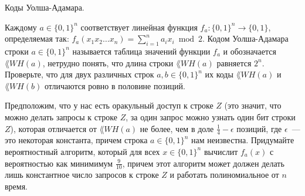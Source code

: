 Коды Уолша-Адамара.
\begin{enumcyr}
    \item Каждому $a \in \{0, 1\}^n$ соответствует линейная функция $f_a: \{0, 1\}^n \to \{0, 1\}$, определяемая так:
	    $f_a(x_1 x_2 \dots x_n) = \sum\limits_{i = 1}^n a_i x_i \bmod 2$. Кодом Уолша-Адамара строки $a \in \{0, 1\}^n$
        называется таблица значений функции $f_a$ и обозначается $\lang{WH}(a)$, нетрудно понять, что длина строки
        $\lang{WH}(a)$ равняется $2^n$. Проверьте, что для двух различных строк $a, b \in \{0, 1\}^n$ их коды $\lang{WH}(a)$
        и $\lang{WH}(b)$ отличаются ровно в половине позиций.
	\item Предположим, что у нас есть оракульный доступ к строке $Z$ (это значит, что можно делать запросы к строке $Z$, за
	    один запрос можно узнать один бит строки $Z$), которая отличается от $\lang{WH}(a)$ не более, чем в доле $\frac{1}{4}
        - \epsilon$ позиций, где $\epsilon$~--- это некоторая константа, причем строка $a \in \{0, 1\}^n$ нам
        неизвестна. Придумайте вероятностный алгоритм, который для всех $x\in \{0,1\}^n$ вычислит $f_a(x)$ с вероятностью как
        минимимум $\frac{9}{10}$, причем этот алгоритм может должен делать лишь константное число запросов к строке $Z$ и
        работать полиномиальное от $n$ время.
\end{enumcyr}